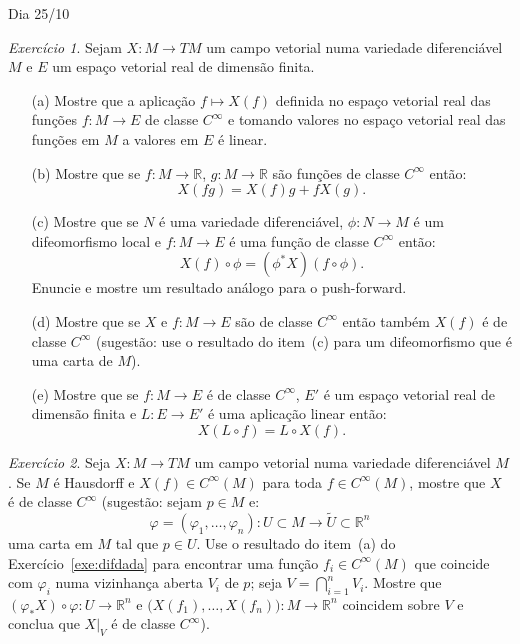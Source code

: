 \documentclass[oneside,11pt]{amsart}
\newcommand{\R}{\mathds R}
\theoremstyle{remark}\newtheorem{exercise}{Exercício}[section]
\theoremstyle{plain}\newtheorem{teo}{Teorema}[section]
\theoremstyle{plain}\newtheorem{lem}[teo]{Lema}
\theoremstyle{plain}\newtheorem{prop}[teo]{Proposição}
\theoremstyle{definition}\newtheorem{defin}[teo]{Definição}
\theoremstyle{remark}\newtheorem{rem}[teo]{Observação}
\theoremstyle{definition}\newtheorem{example}[teo]{Exemplo}
\numberwithin{equation}{section}
\begin{document}
\begin{section}{Dia 25/10}
\begin{exercise}\label{exe:propXf}
Sejam $X:M\to TM$ um campo vetorial numa variedade diferenciável $M$ e $E$ um espaço vetorial real de dimensão finita.
\begin{itemize}
\item[(a)] Mostre que a aplicação $f\mapsto X(f)$ definida no espaço vetorial real das funções $f:M\to E$ de classe $C^\infty$ e tomando valores no espaço vetorial
real das funções em $M$ a valores em $E$ é linear.
\item[(b)] Mostre que se $f:M\to\R$, $g:M\to\R$ são funções de classe $C^\infty$ então:
\[X(fg)=X(f)g+fX(g).\]
\item[(c)] Mostre que se $N$ é uma variedade diferenciável, $\phi:N\to M$ é um difeomorfismo local e $f:M\to E$ é uma função de classe $C^\infty$ então:
\[X(f)\circ\phi=(\phi^*X)(f\circ\phi).\]
Enuncie e mostre um resultado análogo para o push-forward.
\item[(d)] Mostre que se $X$ e $f:M\to E$ são de classe $C^\infty$ então também $X(f)$ é de classe $C^\infty$ (sugestão: use o resultado do item~(c)
para um difeomorfismo que é uma carta de $M$).
\item[(e)] Mostre que se $f:M\to E$ é de classe $C^\infty$, $E'$ é um espaço vetorial real de dimensão finita e $L:E\to E'$ é uma aplicação linear então:
\[X(L\circ f)=L\circ X(f).\]
\end{itemize}
\end{exercise}

\begin{exercise}
Seja $X:M\to TM$ um campo vetorial numa variedade diferenciável $M$. Se $M$ é Hausdorff e $X(f)\in C^\infty(M)$ para toda $f\in C^\infty(M)$, mostre
que $X$ é de classe $C^\infty$ (sugestão: sejam $p\in M$ e:
\[\varphi=(\varphi_1,\ldots,\varphi_n):U\subset M\longrightarrow\widetilde U\subset\R^n\]
uma carta em $M$ tal que $p\in U$. Use o resultado do item~(a) do Exercício~\ref{exe:difdada} para encontrar uma função
$f_i\in C^\infty(M)$ que coincide com $\varphi_i$ numa
vizinhança aberta $V_i$ de $p$; seja $V=\bigcap_{i=1}^nV_i$. Mostre que $(\varphi_*X)\circ\varphi:U\to\R^n$ e $\big(X(f_1),\ldots,X(f_n)\big):M\to\R^n$
coincidem sobre $V$ e conclua que $X\vert_V$ é de classe $C^\infty$).
\end{exercise}


\end{section}
\end{document}
